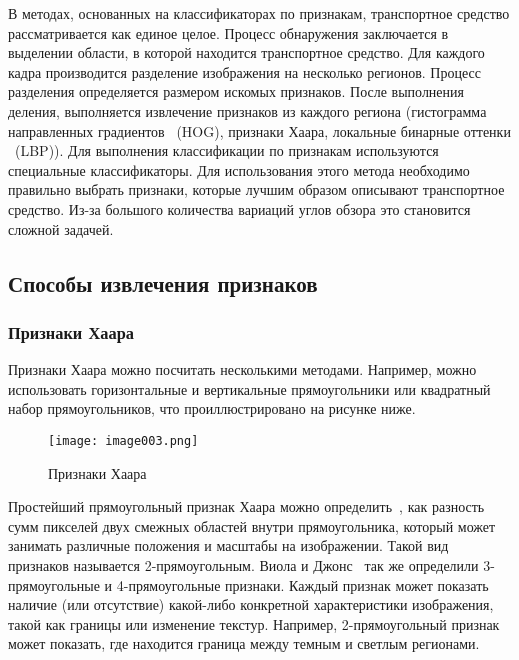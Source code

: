 В методах, основанных на классификаторах по признакам, транспортное средство рассматривается как единое целое. Процесс обнаружения заключается в выделении области, в которой находится транспортное средство. Для каждого кадра производится разделение изображения на несколько регионов. Процесс разделения определяется размером искомых признаков. После выполнения деления, выполняется извлечение признаков из каждого региона (гистограмма направленных градиентов ~(HOG), признаки Хаара, локальные бинарные оттенки ~(LBP)). Для выполнения классификации по признакам используются специальные классификаторы. Для использования этого метода необходимо правильно выбрать признаки, которые лучшим образом описывают транспортное средство. Из-за большого количества вариаций углов обзора это становится сложной задачей.

\subsection{Способы извлечения признаков}

\subsubsection{Признаки Хаара}

Признаки Хаара можно посчитать несколькими методами. Например, можно использовать горизонтальные и вертикальные прямоугольники или квадратный набор прямоугольников, что проиллюстрировано на рисунке ниже.

\begin{figure}[htbp]
\centering
\texttt{[image: image003.png]}
\caption{Признаки Хаара~\cite{two}}%
\label{fig:how-to-do-research}
\end{figure}

Простейший прямоугольный признак Хаара можно определить~\cite{two}, как разность сумм пикселей двух смежных областей внутри прямоугольника, который может занимать различные положения и масштабы на изображении. Такой вид признаков называется 2-прямоугольным. Виола и Джонс~\cite{three} так же определили 3-прямоугольные и 4-прямоугольные признаки. Каждый признак может показать наличие (или отсутствие) какой-либо конкретной характеристики изображения, такой как границы или изменение текстур. Например, 2-прямоугольный признак может показать, где находится граница между темным и светлым регионами.

